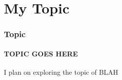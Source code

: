 \section{My Topic}

\begin{frame}
    \frametitle{Topic}
    \framesubtitle{TOPIC GOES HERE}
    I plan on exploring the topic of BLAH
\end{frame}